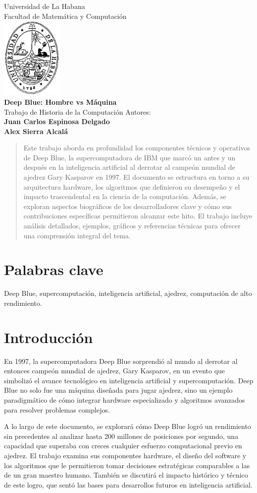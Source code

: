 \documentclass[12pt,a4paper]{article}
\date{Diciembre 2024}
\def\maketitle{%
  \thispagestyle{empty}%
  \begin{center}
    \vskip 3cm
    {\large Universidad de La Habana} \\ Facultad de Matemática y Computación \\ 
    \vskip 0.25cm
    \includegraphics[width=3cm]{uh.png} \\
    \vskip 2cm
    {\LARGE \textbf{\textbf{Deep Blue: Hombre vs Máquina}}} \\
    \vskip 0.25cm
    {\large Trabajo de Historia de la Computación}
    \vskip 2cm
    {\Large Autores:\\ \textbf{Juan Carlos Espinosa Delgado \\ Alex Sierra Alcalá}} \\
    \vfill
    \date{Diciembre 2024}
  \end{center}
}
\begin{document}
\maketitle

\begin{titlepage}
    \centering
    \begin{abstract}
        Este trabajo aborda en profundidad los componentes técnicos y operativos de Deep Blue, la supercomputadora de IBM que marcó un antes y un después en la inteligencia artificial al derrotar al campeón mundial de ajedrez Gary Kasparov en 1997. El documento se estructura en torno a su arquitectura hardware, los algoritmos que definieron su desempeño y el impacto trascendental en la ciencia de la computación. Además, se exploran aspectos biográficos de los desarrolladores clave y cómo sus contribuciones específicas permitieron alcanzar este hito. El trabajo incluye análisis detallados, ejemplos, gráficos y referencias técnicas para ofrecer una comprensión integral del tema.
    \end{abstract}
    \section*{Palabras clave}
    Deep Blue, supercomputación, inteligencia artificial, ajedrez, computación de alto rendimiento.
\end{titlepage}


\newpage
\tableofcontents
\newpage

\section{Introducción}
En 1997, la supercomputadora Deep Blue sorprendió al mundo al derrotar al entonces campeón mundial de ajedrez, Gary Kasparov, en un evento que simbolizó el avance tecnológico en inteligencia artificial y supercomputación. Deep Blue no solo fue una máquina diseñada para jugar ajedrez, sino un ejemplo paradigmático de cómo integrar hardware especializado y algoritmos avanzados para resolver problemas complejos. 

A lo largo de este documento, se explorará cómo Deep Blue logró un rendimiento sin precedentes al analizar hasta 200 millones de posiciones por segundo, una capacidad que superaba con creces cualquier esfuerzo computacional previo en ajedrez. El trabajo examina sus componentes hardware, el diseño del software y los algoritmos que le permitieron tomar decisiones estratégicas comparables a las de un gran maestro humano. También se discutirá el impacto histórico y técnico de este logro, que sentó las bases para desarrollos futuros en inteligencia artificial.
\end{document}
